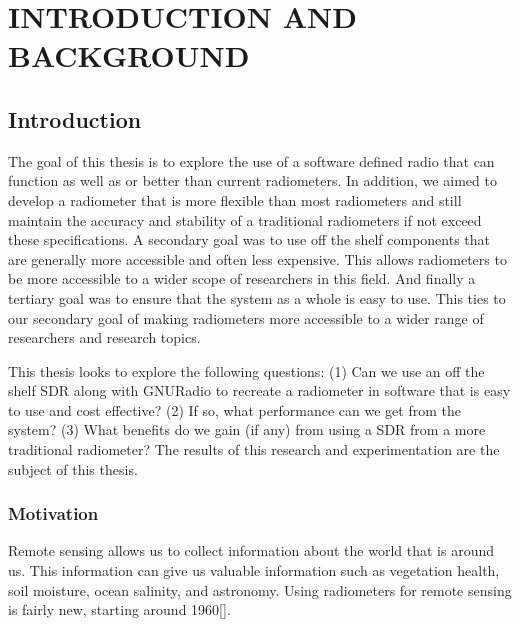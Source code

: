 \chapter{INTRODUCTION AND  BACKGROUND}




\section{Introduction}
The goal of this thesis is to explore the use of a software defined radio that can function as well as or better than current radiometers.  In addition, we aimed to develop a radiometer that is more flexible than most radiometers and still maintain the accuracy and stability of a traditional radiometers if not exceed these specifications.  A secondary goal was to use off the shelf components that are generally more accessible and often less expensive.  This allows radiometers to be more accessible to a wider scope of researchers in this field.  And finally a tertiary goal was to ensure that the system as a whole is easy to use.  This ties to our secondary goal of making radiometers more accessible to a wider range of researchers and research topics.

This thesis looks to explore the following questions: (1) Can we use an off the shelf SDR along with GNURadio to recreate a radiometer in software that is easy to use and cost effective?  (2) If so, what performance can we get from the system?  (3) What benefits do we gain (if any) from using a SDR from a more traditional radiometer? The results of this research and experimentation are the subject of this thesis.

\subsection{Motivation}
Remote sensing allows us to collect information about the world that is around us.  This information can give us valuable information such as vegetation health, soil moisture, ocean salinity, and astronomy.  Using radiometers for remote sensing is fairly new, starting around 1960[\cite{Ulaby}].  


